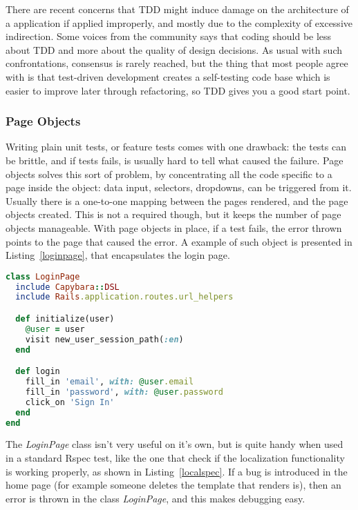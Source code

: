 There are recent concerns that TDD might induce damage on the architecture of a
application if applied improperly, and mostly due to the complexity of excessive
indirection. Some voices from the community says that coding should be less
about TDD and more about the quality of design decisions.
As usual with such confrontations, consensus is rarely reached, but the thing
that most people agree with is that test-driven development creates a
self-testing code base which is easier to improve later through refactoring, so
TDD gives you a good start point.

\subsubsection{Page Objects}
Writing plain unit tests, or feature tests comes with one drawback: the tests
can be brittle, and if tests fails, is usually hard to
tell what caused the failure. Page objects solves this sort of problem, by
concentrating all the code specific to a page inside the object: data input,
selectors, dropdowns, can be triggered from it. Usually there is a one-to-one mapping
between the pages rendered, and the page objects created. This is not a required though,
but it keeps the number of page objects manageable.
With page objects in place, if a test fails, the error thrown points to the page that caused
the error. A example of such object is presented in Listing~\ref{loginpage}, that encapsulates the
login page.
\begin{lstlisting}[language=Ruby, caption={Login Page object}, label=loginpage]
class LoginPage
  include Capybara::DSL
  include Rails.application.routes.url_helpers

  def initialize(user)
    @user = user
    visit new_user_session_path(:en)
  end

  def login
    fill_in 'email', with: @user.email
    fill_in 'password', with: @user.password
    click_on 'Sign In'
  end
end
\end{lstlisting}

The \textit{LoginPage} class isn't very useful on it's own, but is quite handy when used
in a standard Rspec test, like the one that check if the localization functionality
is working properly, as shown in Listing~\ref{localspec}. If a bug is introduced in the home page (for
example someone deletes the template that renders is), then an error is thrown in
the class \textit{LoginPage}, and this makes debugging easy.

